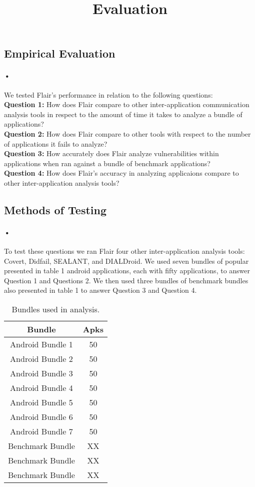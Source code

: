 \documentclass[twocolumn]{article}
\title{Evaluation}
\begin{document}
\begin{center}
\section[1]{Empirical Evaluation}
\end{center}


\paragraph{•}
	We tested Flair's performance in relation to the following questions:\\
	\textbf{Question 1:} How does Flair compare to other inter-application communication analysis tools in respect to the amount of time it takes to analyze a bundle of applications?\\
	\textbf{Question 2:} How does Flair compare to other tools with respect to the number of applications it fails to analyze?\\
	\textbf{Question 3:} How accurately does Flair analyze vulnerabilities within applications when ran against a bundle of benchmark applications?\\
	\textbf{Question 4:} How does Flair's accuracy in analyzing applicaions compare to other inter-application analysis tools?\\

\subsection{Methods of Testing}
\paragraph{•}
	To test these questions we ran Flair four other inter-application analysis tools: Covert, Didfail, SEALANT, and DIALDroid. We used seven bundles of popular presented in table 1 android applications, each with fifty applications, to answer Question 1 and Questions 2. We then used three bundles of benchmark bundles also presented in table 1 to answer Question 3 and Question 4. 


\begin{table}[h]
\begin{center}
\begin{tabular}{ |c c| }
	\hline
	Bundle & Apks\\
	\hline
	Android Bundle 1 & 50\\
	Android Bundle 2 & 50\\
	Android Bundle 3 & 50\\
	Android Bundle 4 & 50\\
	Android Bundle 5 & 50\\
	Android Bundle 6 & 50\\
	Android Bundle 7 & 50\\
	Benchmark Bundle & XX\\
	Benchmark Bundle & XX\\
	Benchmark Bundle & XX\\
	\hline
\end{tabular}
\end{center}
\caption{Bundles used in analysis.}
\label{table:1}
\end{table}
\end{document}

